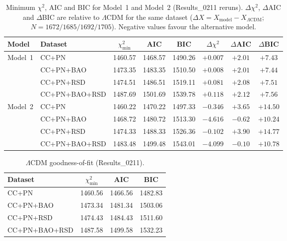 \begin{table}[t]
\centering
\caption{Minimum $\chi^2$, AIC and BIC for Model~1 and Model~2 (Results\_0211 reruns). $\Delta\chi^2$, $\Delta$AIC and $\Delta$BIC are relative to $\Lambda$CDM for the same dataset ($\Delta X=X_{\mathrm{model}}-X_{\Lambda\mathrm{CDM}}$; $N=1672/1685/1692/1705$). Negative values favour the alternative model.}
\label{tab:AIC_BIC_0211}
\begin{tabular}{llcccccc}
\hline
Model & Dataset & $\chi^2_{\min}$ & AIC & BIC & $\Delta\chi^2$ & $\Delta$AIC & $\Delta$BIC \\
\hline
\multirow{4}{*}{Model~1}
 & CC+PN & 1460.57 & 1468.57 & 1490.26 & $+0.007$ & $+2.01$ & $+7.43$ \\
 & CC+PN+BAO & 1473.35 & 1483.35 & 1510.50 & $+0.008$ & $+2.01$ & $+7.44$ \\
 & CC+PN+RSD & 1474.51 & 1486.51 & 1519.11 & $+0.081$ & $+2.08$ & $+7.51$ \\
 & CC+PN+BAO+RSD & 1487.69 & 1501.69 & 1539.78 & $+0.118$ & $+2.12$ & $+7.56$ \\
\hline
\multirow{4}{*}{Model~2}
 & CC+PN & 1460.22 & 1470.22 & 1497.33 & $-0.346$ & $+3.65$ & $+14.50$ \\
 & CC+PN+BAO & 1468.72 & 1480.72 & 1513.30 & $-4.616$ & $-0.62$ & $+10.24$ \\
 & CC+PN+RSD & 1474.33 & 1488.33 & 1526.36 & $-0.102$ & $+3.90$ & $+14.77$ \\
 & CC+PN+BAO+RSD & 1483.48 & 1499.48 & 1543.01 & $-4.099$ & $-0.10$ & $+10.78$ \\
\hline
\end{tabular}
\end{table}

\begin{table}[t]
\centering
\caption{$\Lambda$CDM goodness-of-fit (Results\_0211).}
\label{tab:LCDM_AIC_0211}
\begin{tabular}{lccc}
\hline
Dataset & $\chi^2_{\min}$ & AIC & BIC \\
\hline
CC+PN & 1460.56 & 1466.56 & 1482.83 \\
CC+PN+BAO & 1473.34 & 1481.34 & 1503.06 \\
CC+PN+RSD & 1474.43 & 1484.43 & 1511.60 \\
CC+PN+BAO+RSD & 1487.58 & 1499.58 & 1532.23 \\
\hline
\end{tabular}
\end{table}
